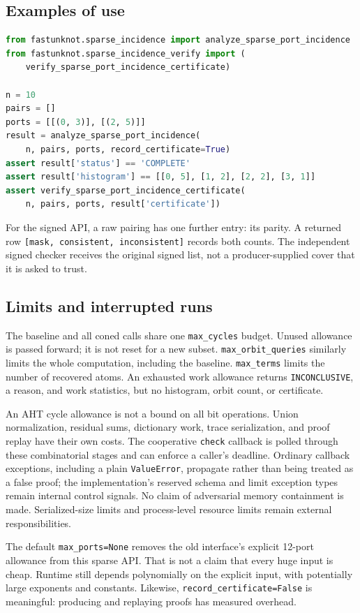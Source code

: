 \documentclass[11pt,letterpaper]{article}
\theoremstyle{definition}
\newcommand{\code}[1]{\texttt{#1}}
\begin{document}
\subsection{Examples of use}
\begin{lstlisting}[language=Python]
from fastunknot.sparse_incidence import analyze_sparse_port_incidence
from fastunknot.sparse_incidence_verify import (
    verify_sparse_port_incidence_certificate)

n = 10
pairs = []
ports = [[(0, 3)], [(2, 5)]]
result = analyze_sparse_port_incidence(
    n, pairs, ports, record_certificate=True)
assert result['status'] == 'COMPLETE'
assert result['histogram'] == [[0, 5], [1, 2], [2, 2], [3, 1]]
assert verify_sparse_port_incidence_certificate(
    n, pairs, ports, result['certificate'])
\end{lstlisting}
For the signed API, a raw pairing has one further entry: its parity. A
returned row \code{[mask, consistent, inconsistent]} records both counts.
The independent signed checker receives the original signed list, not a
producer-supplied cover that it is asked to trust.

\subsection{Limits and interrupted runs}
The baseline and all coned calls share one \code{max\_cycles} budget.
Unused allowance is passed forward; it is not reset for a new subset.
\code{max\_orbit\_queries} similarly limits the whole computation, including
the baseline. \code{max\_terms} limits the number of recovered atoms. An
exhausted work allowance returns \code{INCONCLUSIVE}, a reason, and work
statistics, but no histogram, orbit count, or certificate.

An AHT cycle allowance is not a bound on all bit operations. Union
normalization, residual sums, dictionary work, trace serialization, and
proof replay have their own costs. The cooperative \code{check} callback
is polled through these combinatorial stages and can enforce a caller's
deadline. Ordinary callback exceptions, including a plain
\code{ValueError}, propagate rather than being treated as a false proof;
the implementation's reserved schema and limit exception types remain
internal control signals. No claim of adversarial memory containment is
made. Serialized-size limits and process-level resource limits remain
external responsibilities.

The default \code{max\_ports=None} removes the old interface's explicit
12-port allowance from this sparse API. That is not a claim that every
huge input is cheap. Runtime still depends polynomially on the explicit
input, with potentially large exponents and constants. Likewise,
\code{record\_certificate=False} is meaningful: producing and replaying
proofs has measured overhead.
\end{document}
